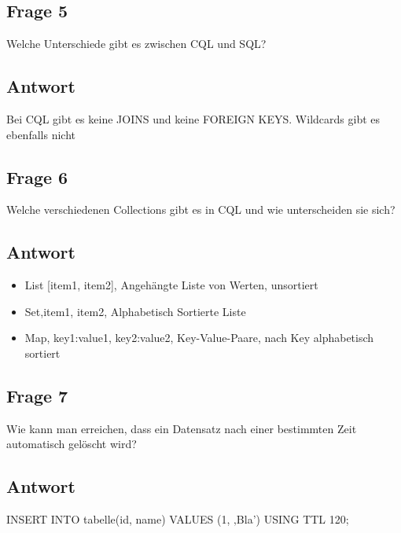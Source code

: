 \subsection*{Frage 5}
Welche Unterschiede gibt es zwischen CQL und SQL?
\subsection*{Antwort}
Bei CQL gibt es keine JOINS und keine FOREIGN KEYS. Wildcards gibt es ebenfalls nicht
\subsection*{Frage 6}
Welche verschiedenen Collections gibt es in CQL und wie unterscheiden sie sich?
\subsection*{Antwort}
\begin{itemize}
	\item List [item1, item2], Angehängte Liste von Werten, unsortiert
	\item Set,{item1, item2}, Alphabetisch Sortierte Liste
	\item Map, {key1:value1, key2:value2}, Key-Value-Paare, nach Key alphabetisch sortiert
\end{itemize}
\subsection*{Frage 7}
Wie kann man erreichen, dass ein Datensatz nach einer bestimmten Zeit automatisch gelöscht wird?
\subsection*{Antwort}
INSERT INTO tabelle(id, name) VALUES (1, ‚Bla’) USING TTL 120;